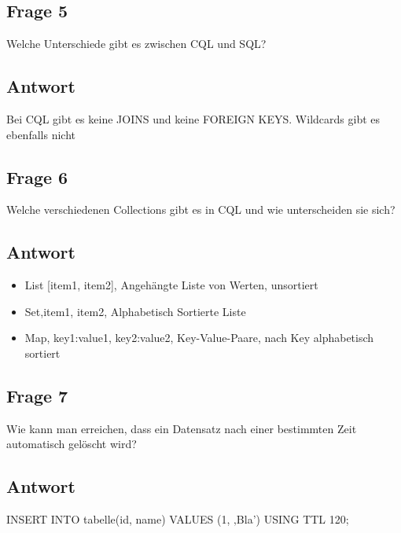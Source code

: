 \subsection*{Frage 5}
Welche Unterschiede gibt es zwischen CQL und SQL?
\subsection*{Antwort}
Bei CQL gibt es keine JOINS und keine FOREIGN KEYS. Wildcards gibt es ebenfalls nicht
\subsection*{Frage 6}
Welche verschiedenen Collections gibt es in CQL und wie unterscheiden sie sich?
\subsection*{Antwort}
\begin{itemize}
	\item List [item1, item2], Angehängte Liste von Werten, unsortiert
	\item Set,{item1, item2}, Alphabetisch Sortierte Liste
	\item Map, {key1:value1, key2:value2}, Key-Value-Paare, nach Key alphabetisch sortiert
\end{itemize}
\subsection*{Frage 7}
Wie kann man erreichen, dass ein Datensatz nach einer bestimmten Zeit automatisch gelöscht wird?
\subsection*{Antwort}
INSERT INTO tabelle(id, name) VALUES (1, ‚Bla’) USING TTL 120;